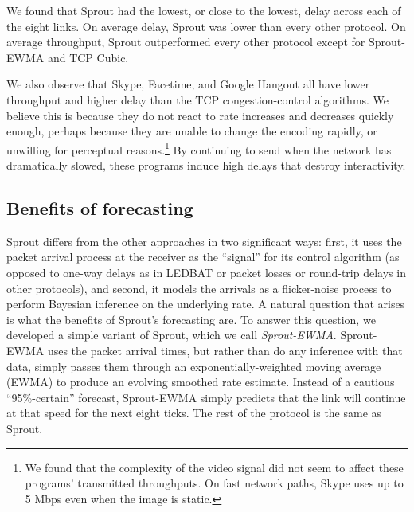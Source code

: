 We found that Sprout had the lowest, or close to the lowest, delay
across each of the eight links. On average delay, Sprout was lower
than every other protocol. On average throughput, Sprout outperformed
every other protocol except for Sprout-EWMA and TCP Cubic.

We also observe that Skype, Facetime, and Google Hangout all have
lower throughput and higher delay than the TCP congestion-control
algorithms. We believe this is because they do not react to rate
increases and decreases quickly enough, perhaps because they are
unable to change the encoding rapidly, or unwilling for perceptual
reasons.\footnote{We found that the complexity of the video signal did
  not seem to affect these programs' transmitted throughputs. On fast
  network paths, Skype uses up to 5 Mbps even when the image is
  static.} By continuing to send when the network has dramatically
slowed, these programs induce high delays that destroy interactivity.

\subsection{Benefits of forecasting}

Sprout differs from the other approaches in two significant ways:
first, it uses the packet arrival process at the receiver as the
``signal'' for its control algorithm (as opposed to one-way delays as
in LEDBAT or packet losses or round-trip delays in other protocols),
and second, it models the arrivals as a flicker-noise process to
perform Bayesian inference on the underlying rate. A natural question
that arises is what the benefits of Sprout's forecasting are. To
answer this question, we developed a simple variant of Sprout, which
we call {\em Sprout-EWMA}. Sprout-EWMA uses the packet arrival times,
but rather than do any inference with that data, simply passes them
through an exponentially-weighted moving average (EWMA) to produce an
evolving smoothed rate estimate. Instead of a cautious
``95\%-certain'' forecast, Sprout-EWMA simply predicts that the link will
continue at that speed for the next eight ticks. The rest of the
protocol is the same as Sprout.

